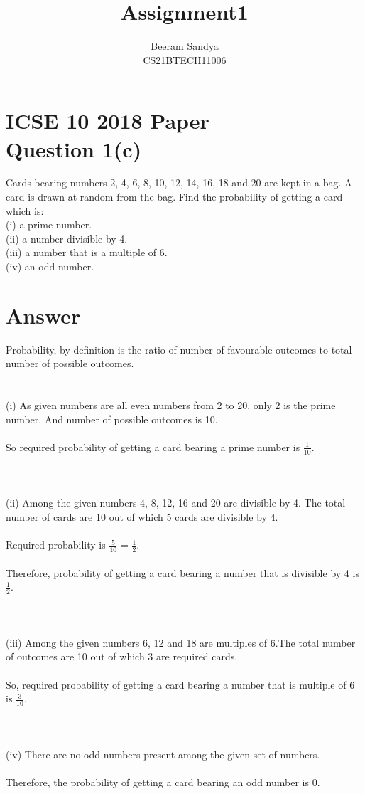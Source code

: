 \documentclass[twocolumn,24pt]{IEEEtran}
\begin{document}
\title{Assignment1}
\author{\Large Beeram Sandya\\CS21BTECH11006}
\maketitle

\section{\Large ICSE 10 2018 Paper\\Question 1(c)}
\Large Cards bearing numbers 2, 4, 6, 8, 10, 12, 14, 16, 18 and 20 are kept in a bag. A card is drawn at random from the bag. Find the probability of getting a card which is:\\ 
(i) a prime number.\\
(ii) a number divisible by 4.\\
(iii) a number that is a multiple of 6.\\
(iv) an odd number.\\
\section{ \LARGE Answer}
 Probability, by definition is the ratio of number of favourable outcomes to total number of possible outcomes.\\\\\\
(i) As given numbers are all even numbers from 2 to 20, only 2 is the prime number. And number of possible outcomes is 10.\\\\
So required probability of getting a card bearing a prime number is \( \frac{1}{10} \).\\\\\\\\
(ii) Among the given numbers 4, 8, 12, 16 and 20 are divisible by 4. The total number of cards are 10 out of which 5 cards are divisible by 4.\\\\
Required probability is \( \frac{5}{10} \) = \( \frac{1}{2} \).
\\\\ Therefore, probability of getting a card bearing a number that is divisible by 4 is \(\frac{1}{2} \).\\\\\\\\
(iii) Among the given numbers 6, 12 and 18 are multiples of 6.The total number of outcomes are 10 out of which 3 are required cards.\\\\
So, required probability of getting a card bearing a number that is multiple of 6 is \(\frac{3}{10}\).\\\\\\\\
(iv) There are no odd numbers present among the given set of numbers.\\\\
Therefore, the probability of getting a card bearing an odd number is  0.
\end{document}
